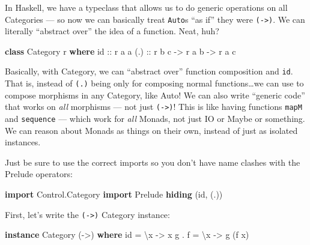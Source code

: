 \documentclass[]{article}
\newenvironment{Shaded}{}{}
\newcommand{\DataTypeTok}[1]{\textcolor[rgb]{0.56,0.13,0.00}{#1}}
\newcommand{\FunctionTok}[1]{\textcolor[rgb]{0.02,0.16,0.49}{#1}}
\newcommand{\KeywordTok}[1]{\textcolor[rgb]{0.00,0.44,0.13}{\textbf{#1}}}
\newcommand{\NormalTok}[1]{#1}
\newcommand{\OtherTok}[1]{\textcolor[rgb]{0.00,0.44,0.13}{#1}}
\begin{document}
In Haskell, we have a typeclass that allows us to do generic operations on all
Categories --- so now we can basically treat \texttt{Auto}s ``as if'' they were
\texttt{(-\textgreater{})}. We can literally ``abstract over'' the idea of a
function. Neat, huh?

\begin{Shaded}
\begin{Highlighting}[]
\KeywordTok{class} \DataTypeTok{Category}\NormalTok{ r }\KeywordTok{where}
\OtherTok{    id  ::}\NormalTok{ r a a}
\OtherTok{    (.) ::}\NormalTok{ r b c }\OtherTok{->}\NormalTok{ r a b }\OtherTok{->}\NormalTok{ r a c}
\end{Highlighting}
\end{Shaded}

Basically, with Category, we can ``abstract over'' function composition and
\texttt{id}. That is, instead of \texttt{(.)} being only for composing normal
functions\ldots{}we can use to compose morphisms in any Category, like Auto! We
can also write ``generic code'' that works on \emph{all} morphisms --- not just
\texttt{(-\textgreater{})}! This is like having functions \texttt{mapM} and
\texttt{sequence} --- which work for \emph{all} Monads, not just IO or Maybe or
something. We can reason about Monads as things on their own, instead of just as
isolated instances.

Just be sure to use the correct imports so you don't have name clashes with the
Prelude operators:

\begin{Shaded}
\begin{Highlighting}[]
\KeywordTok{import} \DataTypeTok{Control.Category}
\KeywordTok{import} \DataTypeTok{Prelude} \KeywordTok{hiding}\NormalTok{ (id, (.))}
\end{Highlighting}
\end{Shaded}

First, let's write the \texttt{(-\textgreater{})} Category instance:

\begin{Shaded}
\begin{Highlighting}[]
\KeywordTok{instance} \DataTypeTok{Category}\NormalTok{ (}\OtherTok{->}\NormalTok{) }\KeywordTok{where}
\NormalTok{    id    }\FunctionTok{=}\NormalTok{ \textbackslash{}x }\OtherTok{->}\NormalTok{ x}
\NormalTok{    g }\FunctionTok{.}\NormalTok{ f }\FunctionTok{=}\NormalTok{ \textbackslash{}x }\OtherTok{->}\NormalTok{ g (f x)}
\end{Highlighting}
\end{Shaded}
\end{document}
